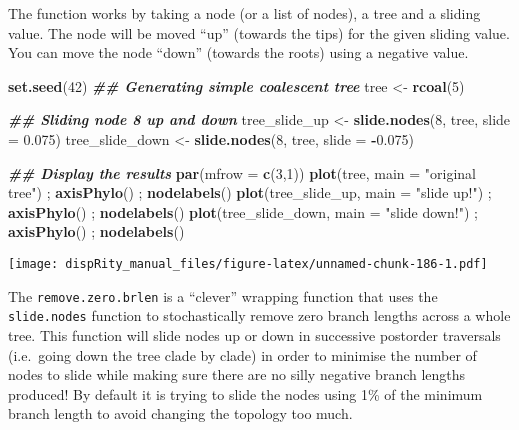 \documentclass[
]{book}
\newenvironment{Shaded}{\begin{snugshade}}{\end{snugshade}}
\newcommand{\AttributeTok}[1]{\textcolor[rgb]{0.13,0.29,0.53}{#1}}
\newcommand{\DecValTok}[1]{\textcolor[rgb]{0.00,0.00,0.81}{#1}}
\newcommand{\DocumentationTok}[1]{\textcolor[rgb]{0.56,0.35,0.01}{\textbf{\textit{#1}}}}
\newcommand{\FloatTok}[1]{\textcolor[rgb]{0.00,0.00,0.81}{#1}}
\newcommand{\FunctionTok}[1]{\textcolor[rgb]{0.13,0.29,0.53}{\textbf{#1}}}
\newcommand{\NormalTok}[1]{#1}
\newcommand{\OtherTok}[1]{\textcolor[rgb]{0.56,0.35,0.01}{#1}}
\newcommand{\SpecialCharTok}[1]{\textcolor[rgb]{0.81,0.36,0.00}{\textbf{#1}}}
\newcommand{\StringTok}[1]{\textcolor[rgb]{0.31,0.60,0.02}{#1}}
\begin{document}
The function works by taking a node (or a list of nodes), a tree and a sliding value.
The node will be moved ``up'' (towards the tips) for the given sliding value.
You can move the node ``down'' (towards the roots) using a negative value.

\begin{Shaded}
\begin{Highlighting}[]
\FunctionTok{set.seed}\NormalTok{(}\DecValTok{42}\NormalTok{)}
\DocumentationTok{\#\# Generating simple coalescent tree}
\NormalTok{tree }\OtherTok{\textless{}{-}} \FunctionTok{rcoal}\NormalTok{(}\DecValTok{5}\NormalTok{)}

\DocumentationTok{\#\# Sliding node 8 up and down}
\NormalTok{tree\_slide\_up }\OtherTok{\textless{}{-}} \FunctionTok{slide.nodes}\NormalTok{(}\DecValTok{8}\NormalTok{, tree, }\AttributeTok{slide =} \FloatTok{0.075}\NormalTok{)}
\NormalTok{tree\_slide\_down }\OtherTok{\textless{}{-}} \FunctionTok{slide.nodes}\NormalTok{(}\DecValTok{8}\NormalTok{, tree, }\AttributeTok{slide =} \SpecialCharTok{{-}}\FloatTok{0.075}\NormalTok{)}

\DocumentationTok{\#\# Display the results}
\FunctionTok{par}\NormalTok{(}\AttributeTok{mfrow =} \FunctionTok{c}\NormalTok{(}\DecValTok{3}\NormalTok{,}\DecValTok{1}\NormalTok{))}
\FunctionTok{plot}\NormalTok{(tree, }\AttributeTok{main =} \StringTok{"original tree"}\NormalTok{) ; }\FunctionTok{axisPhylo}\NormalTok{() ; }\FunctionTok{nodelabels}\NormalTok{()}
\FunctionTok{plot}\NormalTok{(tree\_slide\_up, }\AttributeTok{main =} \StringTok{"slide up!"}\NormalTok{) ; }\FunctionTok{axisPhylo}\NormalTok{() ; }\FunctionTok{nodelabels}\NormalTok{()}
\FunctionTok{plot}\NormalTok{(tree\_slide\_down, }\AttributeTok{main =} \StringTok{"slide down!"}\NormalTok{) ; }\FunctionTok{axisPhylo}\NormalTok{() ; }\FunctionTok{nodelabels}\NormalTok{()}
\end{Highlighting}
\end{Shaded}

\texttt{[image: dispRity\_manual\_files/figure-latex/unnamed-chunk-186-1.pdf]}

The \texttt{remove.zero.brlen} is a ``clever'' wrapping function that uses the \texttt{slide.nodes} function to stochastically remove zero branch lengths across a whole tree.
This function will slide nodes up or down in successive postorder traversals (i.e.~going down the tree clade by clade) in order to minimise the number of nodes to slide while making sure there are no silly negative branch lengths produced!
By default it is trying to slide the nodes using 1\% of the minimum branch length to avoid changing the topology too much.
\end{document}
